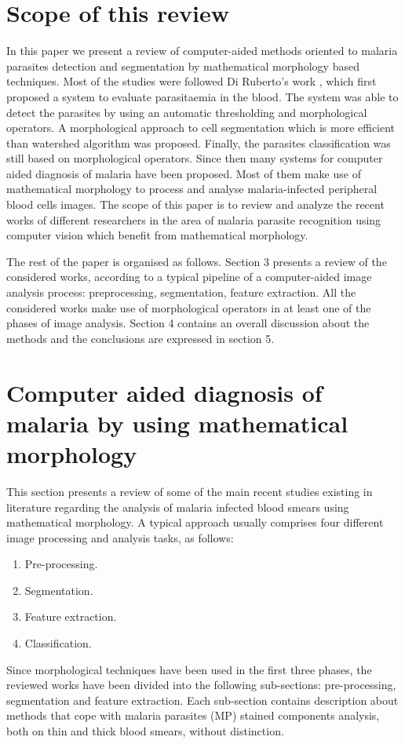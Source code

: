 \documentclass[sensors,review,submit,moreauthors,pdftex,10pt,a4paper]{mdpi}
\begin{document}
	\section{Scope of this review}
	In this paper we present a review of computer-aided methods oriented to malaria parasites detection and segmentation by mathematical morphology based techniques.
	Most of the studies were followed Di Ruberto's work \cite{DiRuberto2002}, which first proposed a system to evaluate parasitaemia in the blood. The system was able to detect the parasites by using an automatic thresholding and morphological operators. A morphological approach to cell segmentation which is more efficient than watershed algorithm \cite{Soille2004} was proposed. Finally, the parasites classification was still based on morphological operators. Since then many systems for computer aided diagnosis of malaria have been proposed. Most of them make use of mathematical morphology to process and analyse malaria-infected peripheral blood cells images. The scope of this paper is to review and analyze the recent works of different researchers in the area of malaria parasite recognition using computer vision which benefit from mathematical morphology.
	
	The rest of the paper is organised as follows. Section 3 presents a review of the considered works, according to a typical pipeline of a computer-aided image analysis process: preprocessing, segmentation, feature extraction.
	All the considered works make use of morphological operators in at least one of the phases of image analysis. Section 4 contains an overall discussion about the methods and the conclusions are expressed in section 5.
	
	\section{Computer aided diagnosis of malaria by using mathematical morphology}
	This section presents a review of some of the main recent studies existing in literature regarding the analysis of malaria infected blood smears using mathematical morphology.
	A typical approach usually comprises four different image processing and analysis tasks, as follows:
	\begin{enumerate}
		\item Pre-processing.
		\item Segmentation.
		\item Feature extraction.
		\item Classification.
	\end{enumerate}
	Since morphological techniques have been used in the first three phases, the reviewed works have been divided into the following sub-sections: pre-processing, segmentation and feature extraction.
	Each sub-section contains description about methods that cope with malaria parasites (MP) stained components analysis, both on thin and thick blood smears, without distinction.
	
\end{document}

